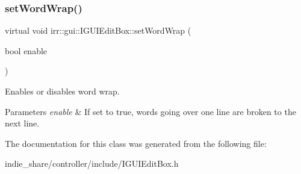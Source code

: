\subsubsection{\texorpdfstring{set\+Word\+Wrap()}{setWordWrap()}\hspace{0.1cm}{\footnotesize\ttfamily [2/2]}}
{\footnotesize\ttfamily virtual void irr\+::gui\+::\+I\+G\+U\+I\+Edit\+Box\+::set\+Word\+Wrap (\begin{DoxyParamCaption}\item[{bool}]{enable }\end{DoxyParamCaption})\hspace{0.3cm}{\ttfamily [pure virtual]}}



Enables or disables word wrap. 


\begin{DoxyParams}{Parameters}
{\em enable} & If set to true, words going over one line are broken to the next line. \\
\hline
\end{DoxyParams}


The documentation for this class was generated from the following file\+:\begin{DoxyCompactItemize}
\item 
indie\+\_\+share/controller/include/I\+G\+U\+I\+Edit\+Box.\+h\end{DoxyCompactItemize}
